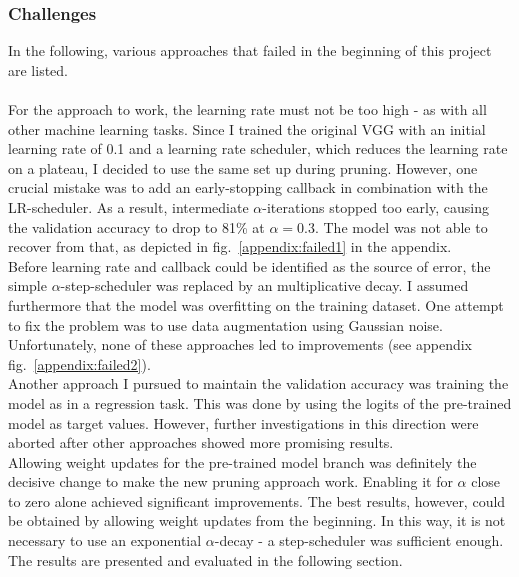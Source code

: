 \documentclass[10pt,twocolumn,letterpaper]{article}
\begin{document}
\subsubsection{Challenges}
In the following, various approaches that failed in the beginning of this project are listed.\\\\
For the approach to work, the learning rate must not be too high - as with all other machine learning tasks.
Since I trained the original VGG with an initial learning rate of 0.1 and a learning rate scheduler, which reduces the learning rate on a plateau, I decided to use the same set up during pruning.
However, one crucial mistake was to add an early-stopping callback in combination with the LR-scheduler.
As a result, intermediate $\alpha$-iterations stopped too early, causing the validation accuracy to drop to 81\% at $\alpha=0.3$.
The model was not able to recover from that, as depicted in fig.~\ref{appendix:failed1} in the appendix.\\
Before learning rate and callback could be identified as the source of error, the simple $\alpha$-step-scheduler was replaced by an multiplicative decay.
I assumed furthermore that the model was overfitting on the training dataset.
One attempt to fix the problem was to use data augmentation using Gaussian noise.
Unfortunately, none of these approaches led to improvements (see appendix fig.~\ref{appendix:failed2}).\\
Another approach I pursued to maintain the validation accuracy was training the model as in a regression task.
This was done by using the logits of the pre-trained model as target values.
However, further investigations in this direction were aborted after other approaches showed more promising results.\\
Allowing weight updates for the pre-trained model branch was definitely the decisive change to make the new pruning approach work.
Enabling it for $\alpha$ close to zero alone achieved significant improvements.
The best results, however, could be obtained by allowing weight updates from the beginning.
In this way, it is not necessary to use an exponential $\alpha$-decay - a step-scheduler was sufficient enough.
The results are presented and evaluated in the following section.
\end{document}
